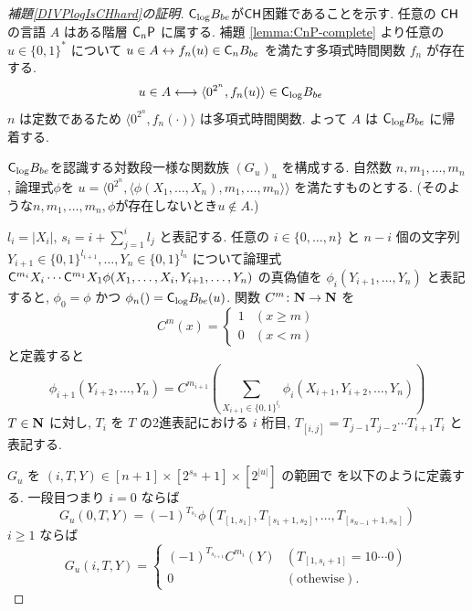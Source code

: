 \begin{proof}[\textup{補題\ref{DIVPlogIsCHhard}の証明}]
 $\mathsf{C}_{\log} B_{be}$が$\mathsf{CH}$困難であることを示す.
 任意の $\mathsf{CH}$ の言語 $A$ はある階層 $\mathsf{C}_n \mathsf{P}$ に属する. 
 補題 \ref{lemma:CnP-complete} より任意の $u \in \{0,1\}^*$ について
 $u \in A \leftrightarrow f_n(u) \in \mathsf{C}_n B_{be}$ 
 を満たす多項式時間関数 $f_n$ が存在する.
 \begin{align}
  u \in A 
  & \longleftrightarrow \langle 0^{2^n}, f_n(u) \rangle \in \mathsf{C}_{\log} B_{be}
 \end{align}
 $n$ は定数であるため $\langle 0^{2^n}, f_n(\cdot) \rangle$ は多項式時間関数.
 よって $A$ は $\mathsf{C}_{\log} B_{be}$ に帰着する.


 $\mathsf{C}_{\log} B_{be}$を認識する対数段一様な関数族 $(G_u)_u$ を構成する.
 自然数 $n, m_1, \dots, m_n$, 論理式$\phi$を
 $u  = \langle 0^{2^n}, 
 \langle \phi(X_1, \dots, X_n), m_1, \dots, m_n \rangle \rangle$
 を満たすものとする. 
 (そのような$n, m_1, \dots, m_n, \phi$が存在しないとき$u \not \in A$.)
 
 
 $l_i = |X_i|$, $s_i = i + \sum^i_{j=1}l_j$ と表記する.
 任意の $i \in \{0, \dots, n\}$ と $n-i$ 個の文字列 
 $Y_{i+1} \in \{0,1\}^{l_{i+1}}, \dots, Y_n \in \{0,1\}^{l_n}$ 
 について論理式
 $\mathsf{C}^{m_{i}}{X_i} \cdots \mathsf{C}^{m_1}{X_1}
 \phi(X_1, \dots, X_i, Y_{i+1}, \dots, Y_n)$
 の真偽値を $\phi_i(Y_{i+1}, \dots, Y_n)$ と表記すると,
 $\phi_0 = \phi$ かつ $\phi_n() = \mathsf{C}_{\log} B_{be} (u)$.
 関数 $C^m \colon \mathbf N \to \mathbf N$ を
 \begin{equation}
  C^m(x) 
     = \begin{cases}
       1 & (x \ge m) \\
       0 & (x < m) 
       \end{cases}
 \end{equation}
 と定義すると
 \begin{equation} \label{eq:phi-step}
  \phi_{i+1}(Y_{i+2}, \dots, Y_n) 
  = C^{m_{i+1}}\left(\sum_{X_{i+1} \in \{ 0,1 \} ^{l_i}}
   \phi_i(X_{i+1}, Y_{i+2}, \dots, Y_{n})\right) 
 \end{equation}
 $T \in \mathbf N$ に対し, $T_i$ を $T$ の2進表記における $i$ 桁目, 
 $T_{[i,j]} = T_{j-1} T_{j-2} \cdots T_{i+1} T_{i}$ と表記する.


 $G_u$ を $(i, T, Y) \in [n+1] \times [2^{s_n}+1] \times [2^{|u|}]$ の範囲で
 を以下のように定義する. 一段目つまり $i=0$ ならば
 \begin{equation}\label{eq:def-Gu:case0}
  G_u(0,T,Y) = 
   (-1)^{T_{s_1}}\phi(T_{[1,s_1]}, T_{[s_1+1,s_2]},
    \dots, T_{[s_{n-1}+1,s_n]}) 
 \end{equation}
 $i \ge 1$ ならば
 \begin{equation} 
  G_u(i,T,Y) = 
   \begin{cases}
    (-1)^{T_{s_{i+1}}} C^{m_i}(Y) 
    & (T_{[1,s_i+1]} = 10 \cdots 0) \\
    0 & (\text{othewise}).
   \end{cases} 
 \end{equation}


\end{proof}
